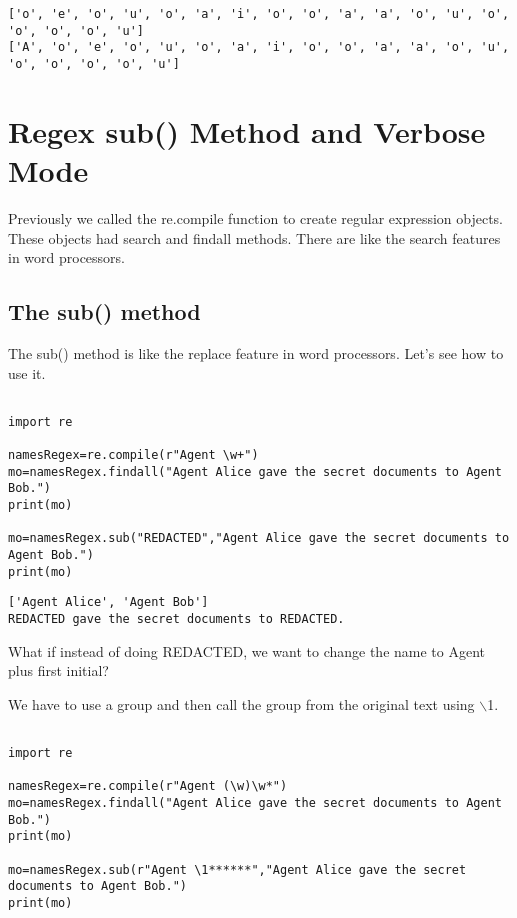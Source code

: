 \documentclass[11pt]{article}
\begin{document}
\begin{verbatim}
['o', 'e', 'o', 'u', 'o', 'a', 'i', 'o', 'o', 'a', 'a', 'o', 'u', 'o', 'o', 'o', 'o', 'u']
['A', 'o', 'e', 'o', 'u', 'o', 'a', 'i', 'o', 'o', 'a', 'a', 'o', 'u', 'o', 'o', 'o', 'o', 'u']
\end{verbatim}

\section{Regex sub() Method and Verbose Mode}
\label{sec:org0446b50}

Previously we called the re.compile function to create regular expression objects. These objects had search and findall methods. There are like the search features in word processors.

\subsection{The sub() method}
\label{sec:org19bf05b}

The sub() method is like the replace feature in word processors. Let's see how to use it.

\begin{verbatim}

import re

namesRegex=re.compile(r"Agent \w+")
mo=namesRegex.findall("Agent Alice gave the secret documents to Agent Bob.")
print(mo)

mo=namesRegex.sub("REDACTED","Agent Alice gave the secret documents to Agent Bob.")
print(mo)

\end{verbatim}

\begin{verbatim}
['Agent Alice', 'Agent Bob']
REDACTED gave the secret documents to REDACTED.
\end{verbatim}


What if instead of doing REDACTED, we want to change the name to Agent plus first initial?

We have to use a group and then call the group from the original text using $\backslash$1.

\begin{verbatim}

import re

namesRegex=re.compile(r"Agent (\w)\w*")
mo=namesRegex.findall("Agent Alice gave the secret documents to Agent Bob.")
print(mo)

mo=namesRegex.sub(r"Agent \1******","Agent Alice gave the secret documents to Agent Bob.")
print(mo)

\end{verbatim}
\end{document}
